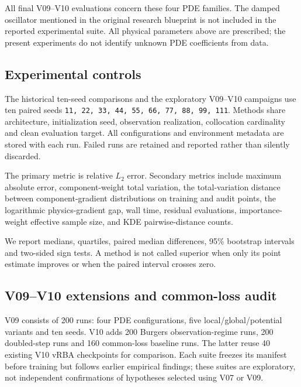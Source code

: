 \documentclass[
  11pt,
]{article}
\begin{document}
All final V09--V10 evaluations concern these four PDE families. The
damped oscillator mentioned in the original research blueprint is not
included in the reported experimental suite. All physical parameters
above are prescribed; the present experiments do not identify unknown
PDE coefficients from data.

\hypertarget{experimental-controls}{%
\subsection{Experimental controls}\label{experimental-controls}}

The historical ten-seed comparisons and the exploratory V09--V10
campaigns use ten paired seeds
\texttt{11,\ 22,\ 33,\ 44,\ 55,\ 66,\ 77,\ 88,\ 99,\ 111}. Methods share
architecture, initialization seed, observation realization, collocation
cardinality and clean evaluation target. All configurations and
environment metadata are stored with each run. Failed runs are retained
and reported rather than silently discarded.

The primary metric is relative \(L_2\) error. Secondary metrics include
maximum absolute error, component-weight total variation, the
total-variation distance between component-gradient distributions on
training and audit points, the logarithmic physics-gradient gap, wall
time, residual evaluations, importance- weight effective sample size,
and KDE pairwise-distance counts.

We report medians, quartiles, paired median differences, 95\% bootstrap
intervals and two-sided sign tests. A method is not called superior when
only its point estimate improves or when the paired interval crosses
zero.

\hypertarget{v09v10-extensions-and-common-loss-audit}{%
\subsection{V09--V10 extensions and common-loss
audit}\label{v09v10-extensions-and-common-loss-audit}}

V09 consists of 200 runs: four PDE configurations, five
local/global/potential variants and ten seeds. V10 adds 200 Burgers
observation-regime runs, 200 doubled-step runs and 160 common-loss
baseline runs. The latter reuse 40 existing V10 vRBA checkpoints for
comparison. Each suite freezes its manifest before training but follows
earlier empirical findings; these suites are exploratory, not
independent confirmations of hypotheses selected using V07 or V09.
\end{document}
